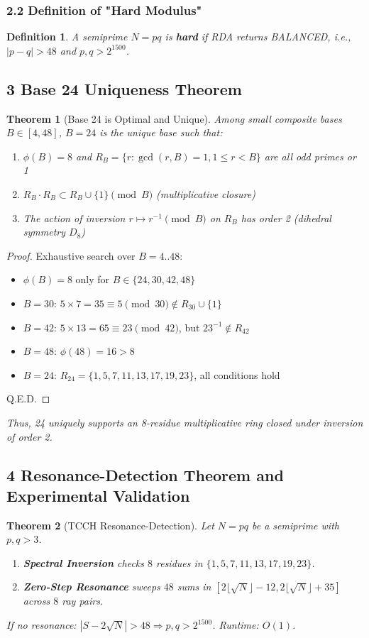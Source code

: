 \documentclass{article}
\newcommand{\Rtwentyfour}{\{1,5,7,11,13,17,19,23\}}
\newtheorem{theorem}{Theorem}
\newtheorem{definition}{Definition}
\begin{document}
\subsubsection*{2.2 Definition of "Hard Modulus"}
\begin{definition}
A semiprime $N = p q$ is \textbf{hard} if RDA returns BALANCED, i.e., $|p - q| > 48$ and $p, q > 2^{1500}$.
\end{definition}
\subsection*{3 Base 24 Uniqueness Theorem}
\begin{theorem}[Base 24 is Optimal and Unique]
Among small composite bases $B \in [4,48]$, $B=24$ is the \emph{unique} base such that:
\begin{enumerate}
  \item $\phi(B) = 8$ and $R_B = \{ r : \gcd(r,B)=1, 1 \le r < B \}$ are all odd primes or 1
  \item $R_B \cdot R_B \subset R_B \cup \{1\} \pmod{B}$ (multiplicative closure)
  \item The action of inversion $r \mapsto r^{-1} \pmod{B}$ on $R_B$ has order 2 (dihedral symmetry $D_8$)
\end{enumerate}
\end{theorem}
\begin{proof}
Exhaustive search over $B=4..48$:
\begin{itemize}
  \item $\phi(B)=8$ only for $B \in \{24,30,42,48\}$
  \item $B=30$: $5 \times 7 = 35 \equiv 5 \pmod{30} \notin R_{30} \cup \{1\}$
  \item $B=42$: $5 \times 13 = 65 \equiv 23 \pmod{42}$, but $23^{-1} \notin R_{42}$
  \item $B=48$: $\phi(48)=16 > 8$
  \item $B=24$: $R_{24} = \Rtwentyfour$, all conditions hold
\end{itemize}
Q.E.D.
\end{proof}
\emph{Thus, 24 uniquely supports an 8-residue multiplicative ring closed under inversion of order 2.}
\subsection*{4 Resonance-Detection Theorem and Experimental Validation}
\begin{theorem}[TCCH Resonance-Detection]
Let $N=pq$ be a semiprime with $p,q>3$.
\begin{enumerate}
  \item \textbf{Spectral Inversion} checks $8$ residues in $\Rtwentyfour$.
  \item \textbf{Zero-Step Resonance} sweeps $48$ sums in $[2\lfloor\sqrt{N}\rfloor-12, 2\lfloor\sqrt{N}\rfloor+35]$ across $8$ ray pairs.
\end{enumerate}
If no resonance: $|S - 2\sqrt{N}| > 48 \Rightarrow p,q > 2^{1500}$.
Runtime: $O(1)$.
\end{theorem}
\end{document}
